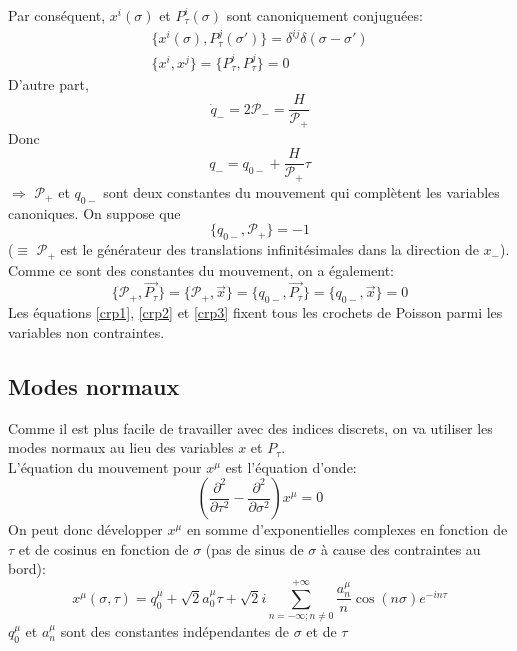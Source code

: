 \documentclass[a4paper,12pt]{article}
\def\xmu{x^\mu}
\def\CP{\mathcal{P}}
\def\pt{P_\tau}
\begin{document}
Par conséquent, $x^i(\sigma)$ et $\pt^i(\sigma)$ sont canoniquement conjuguées:
\begin{equation}
	\begin{aligned}
	\{x^i(\sigma),\pt^j(\sigma')\}=\delta^{ij}\delta(\sigma-\sigma')\\
	\{x^i,x^j\}=\{\pt^i,\pt^j\}=0
	\end{aligned}\label{crp1}
\end{equation}
D'autre part, $$\dot{q}_-=2\CP_-=\frac{H}{\CP_+}$$
Donc $$q_-=q_{0-}+\frac{H}{\CP_+}\tau$$
$\Rightarrow$ $\CP_+$ et $q_{0-}$ sont deux constantes du mouvement qui complètent les variables canoniques. On suppose que 
\begin{equation}
\{q_{0-},\CP_+\}=-1\label{crp2}
\end{equation}
($\equiv$ $\CP_+$ est le générateur des translations infinitésimales dans la direction de $x_-$).
Comme ce sont des constantes du mouvement, on a également:
\begin{equation}
\{\CP_+,\vec{\pt}\}=\{\CP_+,\vec{x}\}=\{q_{0-},\vec{\pt}\}=\{q_{0-},\vec{x}\}=0\label{crp3}
\end{equation}
Les équations \eqref{crp1}, \eqref{crp2} et \eqref{crp3} fixent tous les crochets de Poisson parmi les variables non contraintes.
\subsection{Modes normaux}
Comme il est plus facile de travailler avec des indices discrets, on va utiliser les modes normaux au lieu des variables $x$ et $\pt$.\\
L'équation du mouvement pour $\xmu$ est l'équation d'onde:
$$\left( \frac{\partial^2}{\partial  \tau^2}-\frac{\partial^2}{\partial  \sigma^2}\right) \xmu=0$$
On peut donc développer $\xmu$ en somme d'exponentielles complexes en fonction de $\tau$ et de cosinus en fonction de $\sigma$ (pas de sinus de $\sigma$ à cause des contraintes au bord):
\begin{equation}
\xmu(\sigma,\tau)= q_0^\mu + \sqrt{2}a_0^\mu \tau + \sqrt{2}i\sum_{n=-\infty;n\neq 0}^{+\infty}\frac{a_n^\mu}{n}\cos(n\sigma)e^{-in\tau}
\end{equation}
$q_0^\mu$ et $a_n^\mu$ sont des constantes indépendantes de $\sigma$ et de $\tau$
\end{document}
